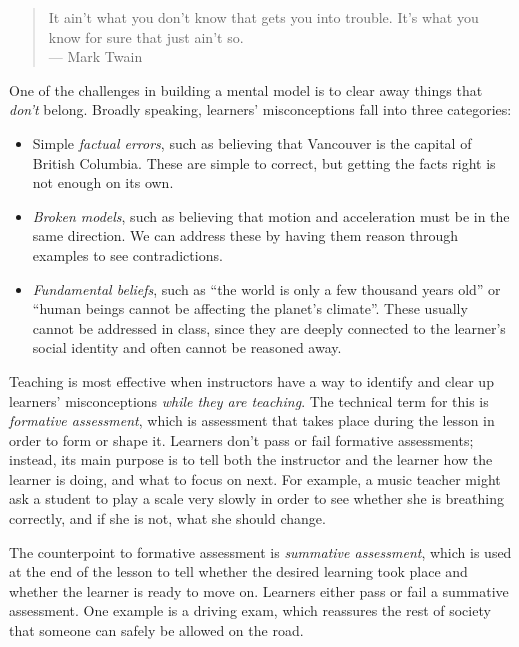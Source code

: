 \begin{quote}
It ain't what you don't know that gets you into trouble. It's what you
know for sure that just ain't so.\\--- Mark Twain
\end{quote}

One of the challenges in building a mental model is to clear away
things that \emph{don't} belong. Broadly speaking, learners'
misconceptions fall into three categories:

\begin{itemize}

\item
  Simple \emph{factual errors}, such as believing that Vancouver is
  the capital of British Columbia. These are simple to correct, but
  getting the facts right is not enough on its own.

\item
  \emph{Broken models}, such as believing that motion and acceleration
  must be in the same direction. We can address these by having them
  reason through examples to see contradictions.

\item
  \emph{Fundamental beliefs}, such as ``the world is only a few
  thousand years old'' or ``human beings cannot be affecting the
  planet's climate''. These usually cannot be addressed in class,
  since they are deeply connected to the learner's social identity and
  often cannot be reasoned away.

\end{itemize}

Teaching is most effective when instructors have a way to identify and
clear up learners' misconceptions \emph{while they are teaching}.  The
technical term for this is \emph{formative assessment}, which is
assessment that takes place during the lesson in order to form or
shape it.  Learners don't pass or fail formative assessments; instead,
its main purpose is to tell both the instructor and the learner how
the learner is doing, and what to focus on next.  For example, a music
teacher might ask a student to play a scale very slowly in order to
see whether she is breathing correctly, and if she is not, what she
should change.

The counterpoint to formative assessment is \emph{summative
assessment}, which is used at the end of the lesson to tell whether
the desired learning took place and whether the learner is ready to
move on.  Learners either pass or fail a summative assessment. One
example is a driving exam, which reassures the rest of society that
someone can safely be allowed on the road.

